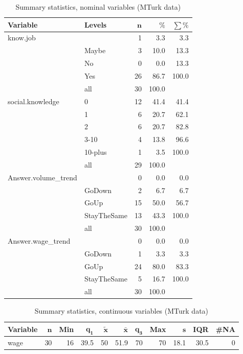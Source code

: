 \documentclass[a4paper,10pt]{article}\usepackage[]{graphicx}\usepackage[]{color}
\begin{document}
\begin{table}[ht]
\centering
{\footnotesize
\begin{tabular}{ll|rrr}
 \textbf{Variable} & \textbf{Levels} & $\mathbf{n}$ & $\mathbf{\%}$ & $\mathbf{\sum \%}$ \\ 
  \hline
know.job &  & 1 & 3.3 & 3.3 \\ 
   & Maybe & 3 & 10.0 & 13.3 \\ 
   & No & 0 & 0.0 & 13.3 \\ 
   & Yes & 26 & 86.7 & 100.0 \\ 
   \hline
 & all & 30 & 100.0 &  \\ 
   \hline
\hline
social.knowledge & 0 & 12 & 41.4 & 41.4 \\ 
   & 1 & 6 & 20.7 & 62.1 \\ 
   & 2 & 6 & 20.7 & 82.8 \\ 
   & 3-10 & 4 & 13.8 & 96.6 \\ 
   & 10-plus & 1 & 3.5 & 100.0 \\ 
   \hline
 & all & 29 & 100.0 &  \\ 
   \hline
\hline
Answer.volume\_trend &  & 0 & 0.0 & 0.0 \\ 
   & GoDown & 2 & 6.7 & 6.7 \\ 
   & GoUp & 15 & 50.0 & 56.7 \\ 
   & StayTheSame & 13 & 43.3 & 100.0 \\ 
   \hline
 & all & 30 & 100.0 &  \\ 
   \hline
\hline
Answer.wage\_trend &  & 0 & 0.0 & 0.0 \\ 
   & GoDown & 1 & 3.3 & 3.3 \\ 
   & GoUp & 24 & 80.0 & 83.3 \\ 
   & StayTheSame & 5 & 16.7 & 100.0 \\ 
   \hline
 & all & 30 & 100.0 &  \\ 
   \hline
\hline
\end{tabular}
}
\caption{Summary statistics, nominal variables (MTurk data)} 
\label{tab1:23-1010}
\end{table}
\begin{table}[ht]
\centering
{\footnotesize
\begin{tabular}{lrrrrrrrrrr}
 \textbf{Variable} & $\mathbf{n}$ & \textbf{Min} & $\mathbf{q_1}$ & $\mathbf{\widetilde{x}}$ & $\mathbf{\bar{x}}$ & $\mathbf{q_3}$ & \textbf{Max} & $\mathbf{s}$ & \textbf{IQR} & \textbf{\#NA} \\ 
  \hline
wage & 30 & 16 & 39.5 & 50 & 51.9 & 70 & 70 & 18.1 & 30.5 & 0 \\ 
  \end{tabular}
}
\caption{Summary statistics, continuous variables (MTurk data)} 
\label{tab2:23-1010}
\end{table}
\end{document}
